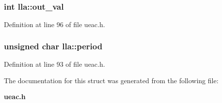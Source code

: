 \subsubsection{\setlength{\rightskip}{0pt plus 5cm}int {\bf lla::out\_\-val}}\label{structlla_o7}




Definition at line 96 of file ueac.h.
\subsubsection{\setlength{\rightskip}{0pt plus 5cm}unsigned char {\bf lla::period}}\label{structlla_o4}




Definition at line 93 of file ueac.h.

The documentation for this struct was generated from the following file:\begin{CompactItemize}
\item 
{\bf ueac.h}\end{CompactItemize}
